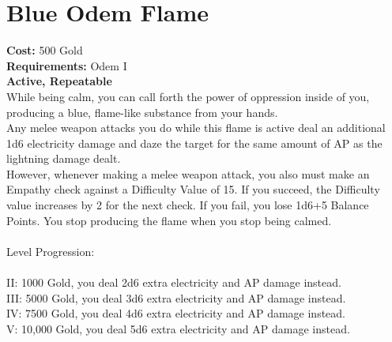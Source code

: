 \section{Blue Odem Flame}
\textbf{Cost:} 500 Gold\\
\textbf{Requirements:} Odem I\\
\textbf{Active, Repeatable}\\
While being calm, you can call forth the power of oppression inside of you, producing a blue, flame-like substance from your hands.\\
Any melee weapon attacks you do while this flame is active deal an additional 1d6 electricity damage and daze the target for the same amount of AP as the lightning damage dealt.\\
However, whenever making a melee weapon attack, you also must make an Empathy check against a Difficulty Value of 15. If you succeed, the Difficulty value increases by 2 for the next check. If you fail, you lose 1d6+5 Balance Points. You stop producing the flame when you stop being calmed.\\ 
\\
Level Progression:\\
\\
II: 1000 Gold, you deal 2d6 extra electricity and AP damage instead.\\
III: 5000 Gold, you deal 3d6 extra electricity and AP damage instead.\\
IV: 7500 Gold, you deal 4d6 extra electricity and AP damage instead.\\
V: 10,000 Gold, you deal 5d6 extra electricity and AP damage instead.\\